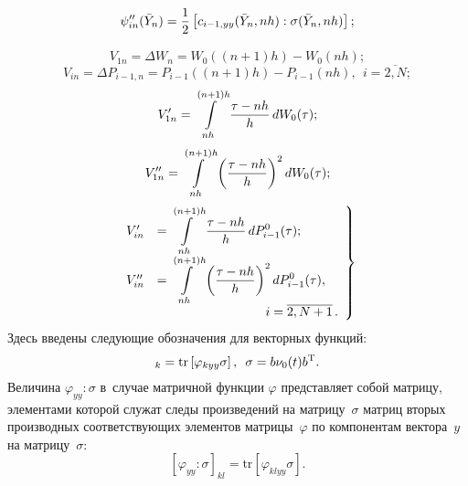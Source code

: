 \begin{multicols}{2}
  
\noindent
\begin{equation*}
    \psi_{{in}}''(\bar Y_n)=\displaystyle\frac{\displaystyle 1\mathstrut}{\displaystyle 2\mathstrut}\left[c_{i-1,yy}(\bar Y_n,nh):
    \sigma(\bar Y_n,nh)\right];
    \end{equation*}
    


\noindent
 \begin{equation*}
 V_{1n}=\Delta W_n=W_0((n+1)h)-W_0(nh); %
 \end{equation*}
\begin{equation*}
V_{{in}}=\Delta P_{i-1,n}=P_{i-1}((n+1)h)-P_{i-1}(nh),
    \ \  i=\overline{2,N}; %
    \end{equation*}
    \begin{equation*}
V_{1n}'=\int\limits_{nh}^{(n+1)h} {\displaystyle\frac{\displaystyle \tau-nh\mathstrut}{\displaystyle h\mathstrut}} \,dW_0(\tau);
\end{equation*}
\begin{equation*}
V_{1n}''=
    \inh \left(\ovth\right)^2 dW_0(\tau); %
    \end{equation*}
    \begin{equation}
    \left.
    \begin{array}{rl}
V_{{in}}'&= \displaystyle \inh \ovth\, dP_{i-1}^0(\tau); 
\\[6pt]
  V_{in}''&=\displaystyle\inh \left(\ovth\right)^2 dP_{i-1}^0(\tau),
    \\[12pt]
    &\hspace*{30mm} i=\overline{2,N+1}\,. %
    \end{array}
    \right\}
    \label{e4.12-s}
    \end{equation}
Здесь введены следующие обозначения для векторных функций:
   \begin{equation*}
   [\varphi_{yy}:\sigma]_k=\mathrm{tr}
\left [\varphi_{kyy}\sigma\right],\enskip \sigma=b\nu_0(t)b^{\mathrm{T}}.
\end{equation*}
Величина
$\varphi_{yy}:\sigma$ в~случае матричной функции $\varphi$
представляет собой матрицу, элементами которой служат следы
произведений на матрицу~$\sigma$
матриц вторых производных соответствующих элементов
матрицы~$\varphi$ по компонентам вектора~$y$ на матрицу~$\sigma$:
    \begin{equation*}
    \left[\varphi_{yy} : \sigma\right]_{kl}=
    \mathrm{tr}\left[\varphi_{klyy}\sigma\right].
    \end{equation*}


\end{multicols}
